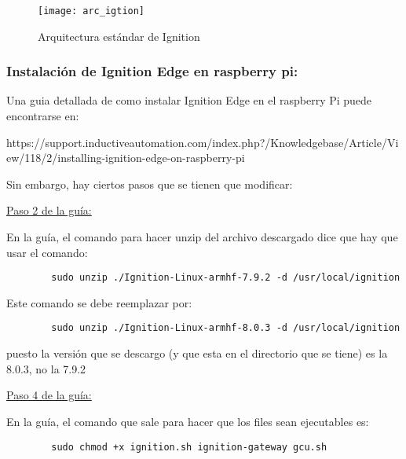 \documentclass[12pt]{article}
\begin{document}
	
	\begin{figure}[h]
		\centering
		\caption{Arquitectura estándar de Ignition}
		\texttt{[image: arc\_igtion]}
	\end{figure}
	
	\subsubsection{Instalación de Ignition Edge en raspberry pi:}
	
	Una guia detallada de como instalar Ignition Edge en el raspberry Pi puede encontrarse en:
	
	\vspace{5mm}
	
	https://support.inductiveautomation.com/index.php?/Knowledgebase/Article/View/118/2/installing-ignition-edge-on-raspberry-pi
	
	\vspace{5mm}
	
	Sin embargo, hay ciertos pasos que se tienen que modificar:
	
	\vspace{5mm}
	
	\underline{Paso 2 de la guía:}
	
	\vspace{5mm}
	
	En la guía, el comando para hacer unzip del archivo descargado dice que hay que usar el comando:
	
	\begin{verbatim}
		sudo unzip ./Ignition-Linux-armhf-7.9.2 -d /usr/local/ignition
	\end{verbatim}
	
	Este comando se debe reemplazar por:
	
	\begin{verbatim}
		sudo unzip ./Ignition-Linux-armhf-8.0.3 -d /usr/local/ignition
	\end{verbatim}
	
	puesto la versión que se descargo (y que esta en el directorio que se tiene) es la 8.0.3, no la 7.9.2 
	
	\underline{Paso 4 de la guía:}
	
	\vspace{5mm}
	
	En la guía, el comando que sale para hacer que los files sean ejecutables es:
	
	\begin{verbatim}
		sudo chmod +x ignition.sh ignition-gateway gcu.sh
	\end{verbatim}
	
\end{document}
